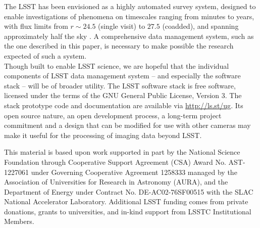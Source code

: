 \documentclass[11pt,twoside]{article}
\begin{document}
The LSST has been envisioned as a highly automated survey system,
designed to enable investigations of phenomena on timescales ranging
from minutes to years, with flux limits from $r \sim 24.5$ (single visit)
to $27.5$ (coadded), and spanning approximately half the sky
\citep{2009arXiv0912.0201L}. A comprehensive data management system, 
such as the one described in this paper, is necessary to make possible
the research expected of such a system.
\\

Though built to enable LSST science, we are hopeful that the individual
components of LSST data management system -- and especially the software
stack -- will be of broader utility.  The LSST software stack is free
software, licensed under the terms of the GNU General Public License,
Version 3.  The stack prototype code and documentation are available via
\url{http://ls.st/ug}.  Its open source nature, an open development process,
a long-term project commitment and a design that can be modified for use
with other cameras may make it useful for the processing of imaging data
beyond LSST.

\acknowledgements

This material is based upon work supported in part by the National
Science Foundation through Cooperative Support Agreement (CSA) Award
No. AST-1227061 under Governing Cooperative Agreement 1258333 managed
by the Association of Universities for Research in Astronomy (AURA),
and the Department of Energy under Contract No. DE-AC02-76SF00515 with
the SLAC National Accelerator Laboratory.  Additional LSST funding
comes from private donations, grants to universities, and in-kind
support from LSSTC Institutional Members.

\end{document}

